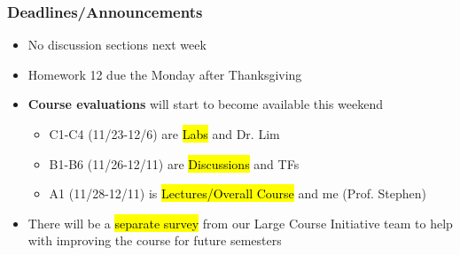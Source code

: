 
\begin{frame}
    \frametitle{Deadlines/Announcements}
\begin{itemize}
            \item No discussion sections next week
            \item Homework 12 due the Monday after Thanksgiving
            \item \textbf{Course evaluations} will start to become available this weekend
            \begin{itemize}
                \item C1-C4 (11/23-12/6) are \hl{Labs} and Dr. Lim
                \item B1-B6 (11/26-12/11) are \hl{Discussions} and TFs
                \item A1 (11/28-12/11) is \hl{Lectures/Overall Course} and me (Prof. Stephen)
            \end{itemize}
            \item There will be a \hl{separate survey} from our Large Course Initiative team to help with improving the course for future semesters
        \end{itemize}
\end{frame}
